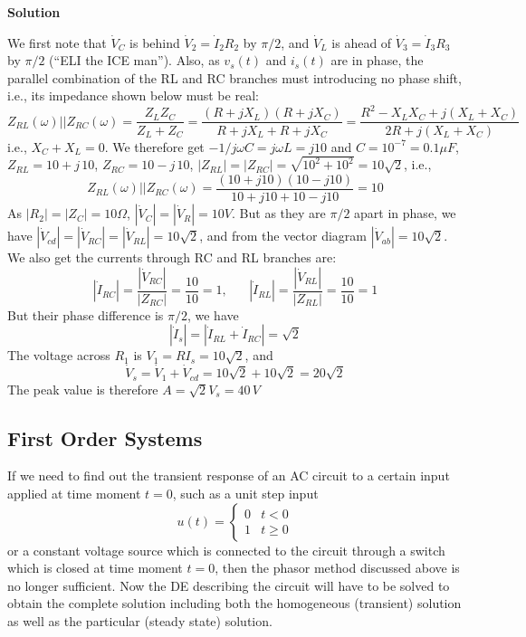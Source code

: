 
{\bf Solution} 


We first note that $\dot{V}_C$ is behind $\dot{V}_2=\dot{I}_2R_2$ 
by $\pi/2$, and $\dot{V}_L$ is ahead of $\dot{V}_3=\dot{I}_3R_3$ by 
$\pi/2$ (``ELI the ICE man''). Also, as $v_s(t)$ and $i_s(t)$ are 
in phase, the parallel combination of the RL and RC branches must
introducing no phase shift, i.e., its impedance shown below must be 
real:
\[
Z_{RL}(\omega)||Z_{RC}(\omega)
=\frac{Z_LZ_C}{Z_L+Z_C}=\frac{(R+jX_L)(R+jX_C)}{R+jX_L+R+jX_C}
=\frac{R^2-X_LX_C+j(X_L+X_C)}{2R+j(X_L+X_C)}
\]
i.e., $X_C+X_L=0$. We therefore get $-1/j\omega C=j\omega L=j 10$
and $C=10^{-7}=0.1\mu F$, $Z_{RL}=10+j\,10$, $Z_{RC}=10-j\,10$, 
$|Z_{RL}|=|Z_{RC}|=\sqrt{10^2+10^2}=10\sqrt{2}$, i.e.,
\[
Z_{RL}(\omega)||Z_{RC}(\omega)=\frac{(10+j10)(10-j10)}{10+j10+10-j10}=10
\]
As $|R_2|=|Z_C|=10 \Omega$, $|\dot{V}_C|=|\dot{V}_R|=10V$.
But as they are $\pi/2$ apart in phase, we have 
$|\dot{V}_{cd}|=|\dot{V}_{RC}|=|\dot{V}_{RL}|=10\sqrt{2}$, and from the
vector diagram $|\dot{V}_{ab}|=10\sqrt{2}$. We also get the currents 
through RC and RL branches are:
\[
|\dot{I}_{RC}|=\frac{|\dot{V}_{RC}|}{|Z_{RC}|}=\frac{10}{10}=1,
\;\;\;\;\;\;
|\dot{I}_{RL}|=\frac{|\dot{V}_{RL}|}{|Z_{RL}|}=\frac{10}{10}=1
\]
But their phase difference is $\pi/2$, we have
\[
|\dot{I}_s|=|\dot{I}_{RL}+\dot{I}_{RC}|=\sqrt{2}
\]
The voltage across $R_1$ is $V_1=RI_s=10\sqrt{2}$, and
\[
\dot{V}_s=\dot{V}_1+\dot{V}_{cd}=10\sqrt{2}+10\sqrt{2}=20\sqrt{2}
\]
The peak value is therefore $A=\sqrt{2} V_s=40\,V$
  
  

\subsection*{First Order Systems}

If we need to find out the transient response of an AC circuit to a certain 
input applied at time moment $t=0$, such as a unit step input 
\[
u(t)=\left\{\begin{array}{ll}0&t<0\\1&t\ge 0\end{array}\right.
\]
or a constant voltage source which is connected to the circuit through a
switch which is closed at time moment $t=0$, then the phasor method discussed
above is no longer sufficient. Now the DE describing the circuit will have 
to be solved to obtain the complete solution including both the homogeneous 
(transient) solution as well as the particular (steady state) solution. 

